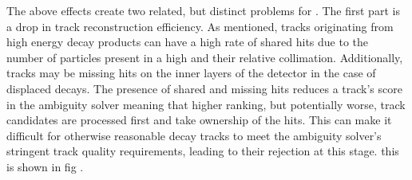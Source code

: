 The above effects create two related, but distinct problems for \btagging.
The first part is a drop in track reconstruction efficiency.
As mentioned, tracks originating from high energy \bhadron decay products can have a high rate of shared hits due to the number of particles present in a high \pT \bjet and their relative collimation.
Additionally, tracks may be missing hits on the inner layers of the detector in the case of displaced decays.
The presence of shared and missing hits reduces a track's score in the ambiguity solver meaning that higher ranking, but potentially worse, track candidates are processed first and take ownership of the hits.
This can make it difficult for otherwise reasonable \bhadron decay tracks to meet the ambiguity solver's stringent track quality requirements, leading to their rejection at this stage.
this is shown in fig .



